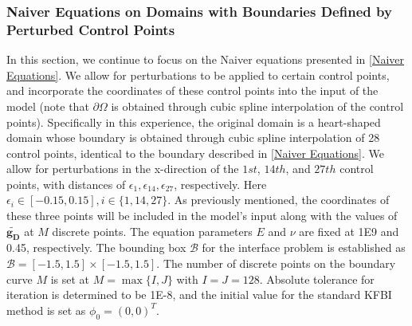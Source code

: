\documentclass{article}
\begin{document}
\subsubsection{Naiver Equations on Domains with Boundaries Defined by Perturbed Control Points} \label{Naiver Equations on Domains with Boundaries Defined by Perturbed Control Points}
In this section, we continue to focus on the Naiver equations presented in \ref{Naiver Equations}. We allow for perturbations to be applied to certain control points, and incorporate the coordinates of these control points into the input of the model (note that $\partial \Omega$ is obtained through cubic spline interpolation of the control points). Specifically in this experience, the original domain is a heart-shaped domain whose boundary is obtained through cubic spline interpolation of 28 control points, identical to the boundary described in \ref{Naiver Equations}. We allow for perturbations in the x-direction of the $1st$, $14th$, and $27th$ control points, with distances of $\epsilon_1, \epsilon_{14}, \epsilon_{27}$, respectively. Here $\epsilon_i \in [-0.15, 0.15], i \in \{1, 14, 27\}$. As previously mentioned, the coordinates of these three points will be included in the model's input along with the values of $\widetilde{\mathbf{g_D}}$ at $M$ 
discrete points. The equation parameters $E$ and $\nu$ are fixed at 1E9 and 0.45, respectively. The bounding box $\mathcal{B}$ for the interface problem is established as $\mathcal{B} = [-1.5,1.5] \times [-1.5,1.5]$. The number of discrete points on the boundary curve $M$ is set at $M = \max\{I, J\}$ with $I = J = 128$. Absolute tolerance for iteration is determined to be 1E-8, and the initial value for the standard KFBI method is set as $\phi_0 = (0, 0)^T$.
\end{document}
